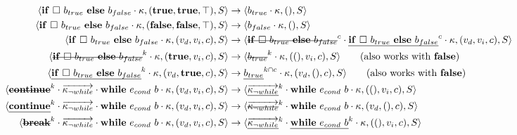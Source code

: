 \documentclass[a4paper,11pt]{article}
\newcommand\mathst[1]{\text{\st{$#1$}}}
\newcommand\mathul[1]{\text{\ul{$#1$}}}
\begin{document}
\begin{align*}
\langle \mathbf{if}\ \square\ b_{true}\ \mathbf{else}\ b_{false} \cdot  \kappa, (\mathbf{true}, \mathbf{true}, \top), S\rangle &\rightarrow \langle b_{true} \cdot \kappa, (), S\rangle\\
\langle \mathbf{if}\ \square\ b_{true}\ \mathbf{else}\ b_{false} \cdot  \kappa, (\mathbf{false}, \mathbf{false}, \top), S\rangle &\rightarrow \langle b_{false} \cdot \kappa, (), S\rangle\\
\langle \mathbf{if}\ \square\ b_{true}\ \mathbf{else}\ b_{false} \cdot  \kappa, (v_d, v_i, c), S\rangle &\rightarrow \langle \mathst{\mathbf{if}\ \square\ b_{true}\ \mathbf{else}\ b_{false}}^c \cdot \mathul{\mathbf{if}\ \square\ b_{true}\ \mathbf{else}\ b_{false}}^c \cdot \kappa, (v_d, v_i, c), S\rangle\\
\langle \mathst{\mathbf{if}\ \square\ b_{true}\ \mathbf{else}\ b_{false}}^k \cdot  \kappa, (\mathbf{true}, v_i, c), S\rangle &\rightarrow \langle \mathst{b_{true}}^k \cdot \kappa, ((), v_i, c), S\rangle \qquad \text{(also works with \textbf{false})}\\
\langle \mathul{\mathbf{if}\ \square\ b_{true}\ \mathbf{else}\ b_{false}}^k \cdot \kappa, (v_d, \mathbf{true}, c), S\rangle &\rightarrow \mathul{b_{true}}^{k \cap c} \cdot \kappa, (v_d, (), c), S\rangle \qquad \text{(also works with \textbf{false})}\\
\langle \mathst{\mathbf{continue}}^k \cdot \overrightarrow{\kappa_{\neg while}} \cdot \mathbf{while}\ e_{cond}\ b \cdot \kappa, (v_d, v_i, c), S\rangle &\rightarrow \langle \overrightarrow{\mathul{\kappa_{\neg while}}}^k \cdot \mathbf{while}\ e_{cond}\ b \cdot \kappa, ((), v_i, c), S\rangle\\
\langle \mathul{\mathbf{continue}}^k \cdot \overrightarrow{\kappa_{\neg while}} \cdot \mathbf{while}\ e_{cond}\ b \cdot \kappa, (v_d, v_i, c), S\rangle &\rightarrow \langle \overrightarrow{\mathst{\kappa_{\neg while}}}^k \cdot \mathbf{while}\ e_{cond}\ b \cdot \kappa, (v_d, (), c), S\rangle\\
\langle \mathst{\mathbf{break}}^k \cdot \overrightarrow{\kappa_{\neg while}} \cdot \mathbf{while}\ e_{cond}\ b \cdot \kappa, (v_d, v_i, c), S\rangle &\rightarrow \langle \overrightarrow{\mathul{\kappa_{\neg while}}}^k \cdot \mathul{\mathbf{while}\ e_{cond}\ b}^k \cdot \kappa, ((), v_i, c), S\rangle\\

\end{align*}
\end{document}
